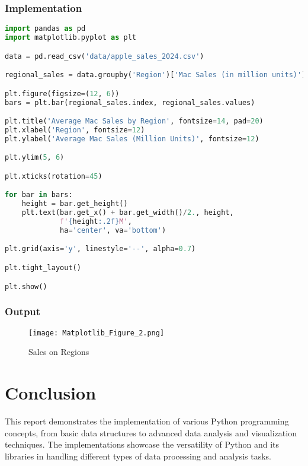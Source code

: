\documentclass[12pt]{article}
\begin{document}
\subsubsection{Implementation}
\begin{lstlisting}[language=Python, caption=Regional Sales Analysis Implementation]
import pandas as pd
import matplotlib.pyplot as plt

data = pd.read_csv('data/apple_sales_2024.csv')

regional_sales = data.groupby('Region')['Mac Sales (in million units)'].mean()

plt.figure(figsize=(12, 6))
bars = plt.bar(regional_sales.index, regional_sales.values)

plt.title('Average Mac Sales by Region', fontsize=14, pad=20)
plt.xlabel('Region', fontsize=12)
plt.ylabel('Average Mac Sales (Million Units)', fontsize=12)

plt.ylim(5, 6)

plt.xticks(rotation=45)

for bar in bars:
    height = bar.get_height()
    plt.text(bar.get_x() + bar.get_width()/2., height,
             f'{height:.2f}M',
             ha='center', va='bottom')

plt.grid(axis='y', linestyle='--', alpha=0.7)

plt.tight_layout()

plt.show()

\end{lstlisting}

\subsubsection{Output}
\begin{figure}[h]
    \centering
    \texttt{[image: Matplotlib\_Figure\_2.png]}
    \caption{Sales on Regions}
    \label{fig:enter-label}
\end{figure}

\section{Conclusion}
This report demonstrates the implementation of various Python programming concepts, from basic data structures to advanced data analysis and visualization techniques. The implementations showcase the versatility of Python and its libraries in handling different types of data processing and analysis tasks.
\end{document}
